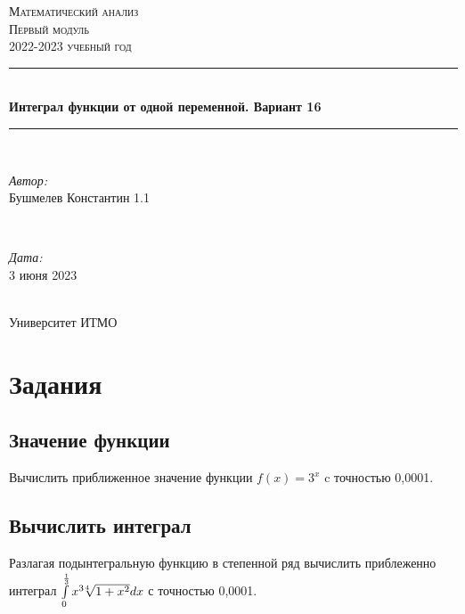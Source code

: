 \documentclass{article}
\begin{document}
\begin{titlepage}
    \centering
    \vspace*{0.5 cm}
    \textsc{\LARGE Математический анализ}\\[1.0 cm]
    \textsc{\Large Первый модуль}\\[0.5 cm]
    \textsc{\large 2022-2023 учебный год}\\[1.5 cm]
    \rule{\linewidth}{0.1 mm} \\[0.4 cm]
    { \huge \bfseries Интеграл функции от одной переменной. Вариант 16}\\[0.2 cm]
    \rule{\linewidth}{0.1 mm} \\[2 cm]
    \begin{minipage}{0.6\textwidth}
        \begin{flushleft} \large
            \emph{Автор:}\\
            Бушмелев Константин 1.1
        \end{flushleft}
    \end{minipage}~
    \begin{minipage}{0.4\textwidth}
        \begin{flushright} \large
            \emph{Дата:} \\
            3 июня 2023
        \end{flushright}
    \end{minipage}\\[2 cm]
    {\large Университет ИТМО}\\[2 cm]
    \vfill
\end{titlepage}

\renewcommand{\contentsname}{Содержимое}
\tableofcontents
\newpage


\section{Задания}

\subsection{Значение функции}

Вычислить приближенное значение функции $f(x) = 3^x$ c точностью 0,0001.

\subsection{Вычислить интеграл}

Разлагая подынтегральную функцию в степенной ряд вычислить приблеженно интеграл $\int\limits_{0}^{\frac{1}{3}} x^3 \sqrt[\leftroot{4} 4]{1 + x^2}dx$ с точностью 0,0001.
\end{document}
